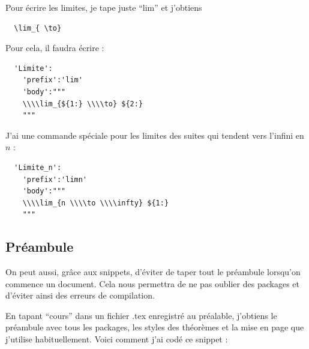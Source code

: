 \documentclass[french]{article}
\theoremstyle{definition}
\theoremstyle{remark}
\begin{document}
Pour écrire les limites, je tape juste ``lim'' et j'obtiens

\begin{verbatim}
  \lim_{ \to}
\end{verbatim}

Pour cela, il faudra écrire :

\begin{verbatim}
  'Limite':
    'prefix':'lim'
    'body':"""
    \\\\lim_{${1:} \\\\to} ${2:}
    """
\end{verbatim}

J'ai une commande spéciale pour les limites des suites qui tendent vers l'infini en \(n\) :

\begin{verbatim}
  'Limite_n':
    'prefix':'limn'
    'body':"""
    \\\\lim_{n \\\\to \\\\infty} ${1:}
    """
\end{verbatim}

\subsection{Préambule}

On peut aussi, grâce aux snippets, d'éviter de taper tout le préambule lorsqu'on commence un document. Cela nous permettra de ne pas oublier des packages et d'éviter ainsi des erreurs de compilation.

En tapant ``cours'' dans un fichier .tex enregistré au préalable, j'obtiens le préambule avec tous les packages, les styles des théorèmes et la mise en page que j'utilise habituellement. Voici comment j'ai codé ce snippet :
\end{document}
